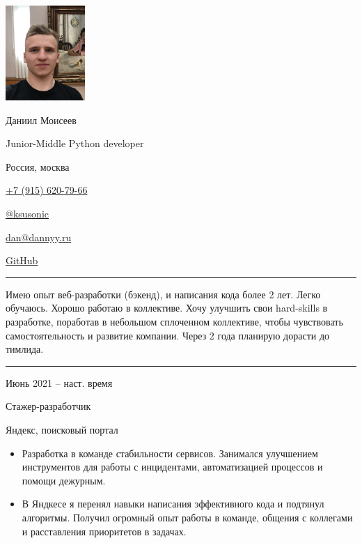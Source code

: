 \documentclass[a4paper,10pt]{article}
\newlength{\cvcolumngapwidth}
\newlength{\cvleftcolumnwidth}
\newlength{\cvrightcolumnwidth}
\newcommand{\cvnamestyle}[1]{{\Large\cvnamefont\textcolor{cvnamecolor}{#1}}}
\newcommand{\cvsectionstyle}[1]{{\normalsize\cvsectionfont\textcolor{cvsectioncolor}{#1}}}
\newcommand{\cvtitlestyle}[1]{{\large\cvtitlefont\textcolor{cvtitlecolor}{#1}}}
\newcommand{\cvdurationstyle}[1]{{\small\cvdurationfont\textcolor{cvdurationcolor}{#1}}}
\newlength{\cvafteritemskipamount}
\newlength{\cvaftersectionskipamount}
\newlength{\cvafternameskipamount}
\newlength{\cvafterpersonalinfolineskipamount}
\newlength{\cvaftertitleskipamount}
\newlength{\cvparskip}
\newcommand{\cvpersonalinfo}[2]{
    \begin{minipage}[t]{\cvleftcolumnwidth}
        \vspace{0mm} %
        \raggedleft #1
    \end{minipage}%
    \hspace{\cvcolumngapwidth}%
    \begin{minipage}[t]{\cvrightcolumnwidth}
        \vspace{0mm} %
        #2
    \end{minipage}

    \vspace{\cvafteritemskipamount}
}
\newcommand{\cvname}[1]{
    \cvnamestyle{#1}

    \vspace{\cvafternameskipamount}
}
\newcommand{\cvpersonalinfolinewithicon}[3]{
    \raisebox{.5\fontcharht\font`E-.5\height}{\texttt{[image: \#2]}}
    #3

    \vspace{\cvafterpersonalinfolineskipamount}
}
\newcommand{\cvsection}[1]{
    \begin{minipage}[t]{\cvleftcolumnwidth}
        \raggedleft\cvsectionstyle{#1}
    \end{minipage}%
    \hspace{\cvcolumngapwidth}%
    \begin{minipage}[t]{\cvrightcolumnwidth}
        \textcolor{cvrulecolor}{\rule{\cvrightcolumnwidth}{0.3mm}}
    \end{minipage}

    \vspace{\cvaftersectionskipamount}
}
\newcommand{\cvitem}[2]{
    \begin{minipage}[t]{\cvleftcolumnwidth}
        \raggedleft #1
    \end{minipage}%
    \hspace{\cvcolumngapwidth}%
    \begin{minipage}[t]{\cvrightcolumnwidth}
        \setlength{\parskip}{\cvparskip} #2
    \end{minipage}

    \vspace{\cvafteritemskipamount}
}
\newcommand{\cvtitle}[1]{
    \cvtitlestyle{#1}

    \vspace{\cvaftertitleskipamount}
    \vspace{-\cvparskip}
}
\begin{document}

\cvpersonalinfo{
    \includegraphics[height=36mm]{dan.jpg}
}{
    \cvname{Даниил Моисеев} 
    \cvdurationstyle {Junior-Middle Python developer}

    \cvpersonalinfolinewithicon{height=4mm}{img/072-location.pdf}{
        Россия, москва
    }

    \cvpersonalinfolinewithicon{height=4mm}{img/067-phone.pdf}{
        \href{tel:+79156207966}{+7 (915) 620-79-66}
    }
    
    \cvpersonalinfolinewithicon{height=4mm}{img/telegram.png}{
        \href{https://t.me/ksusonic}{@ksusonic}
    }

    \cvpersonalinfolinewithicon{height=4mm}{img/070-envelop.pdf}{
        \href{mailto:dan@dannyy.ru}{dan@dannyy.ru}
    }


    \cvpersonalinfolinewithicon{height=4mm}{img/github-square-512.png}{
        \href{https://github.com/ksusonic}{GitHub}
    }
}


\cvsection{О себе}
\cvitem{
    \cvdurationstyle{}
}{
    Имею опыт веб-разработки (бэкенд), и написания кода более 2 лет. Легко обучаюсь. Хорошо работаю в коллективе. Хочу улучшить свои hard-skills в разработке, поработав в небольшом сплоченном коллективе, чтобы чувствовать самостоятельность и развитие компании. Через 2 года планирую дорасти до тимлида.
}


\cvsection{Опыт работы}

\cvitem{
    \cvdurationstyle{Июнь 2021 -- наст. время}
}{
    \cvtitle{Стажер-разработчик}

    Яндекс, поисковый портал

    \begin{itemize}[leftmargin=*]
        \item Разработка в команде стабильности сервисов. Занимался улучшением инструментов для работы с инцидентами, автоматизацией процессов и помощи дежурным. 
        \item В Яндкесе я перенял навыки написания эффективного кода и подтянул алгоритмы. Получил огромный опыт работы в команде, общения с коллегами и расставления приоритетов в задачах. 
    \end{itemize}
}
\end{document}
